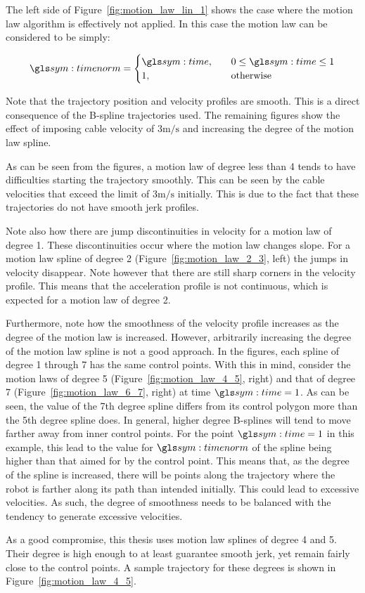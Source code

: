	The left side of Figure~\ref{fig:motion_law_lin_1} shows the case where the
	motion law algorithm is effectively not applied. In this case the motion law
	can be considered to be simply:

	\begin{equation}
		\timenorm =
			\begin{cases}
				\timesym, \quad &0 \leq \timesym \leq 1 \\
				1, \quad &\text{otherwise}
			\end{cases}
	\end{equation}

	Note that the trajectory position and velocity profiles are smooth. This is
	a direct consequence of the B-spline trajectories used. The remaining
	figures show the effect of imposing cable velocity of
	$3\si{\meter\per\second}$ and increasing the degree of the motion law
	spline.

	As can be seen from the figures, a motion law of degree less than 4
	tends to have difficulties starting the trajectory smoothly. This can be
	seen by the cable velocities that exceed the limit of
	$3\si{\meter\per\second}$ initially. This is due to the fact that these
	trajectories do not have smooth jerk profiles.

	Note also how there are jump discontinuities in velocity for a motion law of
	degree 1. These discontinuities occur where the motion law changes slope.
	For a motion law spline of degree 2 (Figure~\ref{fig:motion_law_2_3}, left)
	the jumps in velocity disappear. Note however that there are still sharp
	corners in the velocity profile. This means that the acceleration profile is
	not continuous, which is expected for a motion law of degree 2.

	Furthermore, note how the smoothness of the velocity profile increases as
	the degree of the motion law is increased. However, arbitrarily increasing
	the degree of the motion law spline is not a good approach. In the figures,
	each spline of degree 1 through 7 has the same control points. With this in
	mind, consider the motion laws of degree 5 (Figure~\ref{fig:motion_law_4_5},
	right) and that of degree 7 (Figure~\ref{fig:motion_law_6_7}, right) at time
	$\timesym = 1$. As can be seen, the value of the 7th degree spline differs
	from its control polygon more than the 5th degree spline does. In general,
	higher degree B-splines will tend to move farther away from inner control
	points. For the point $\timesym = 1$ in this example, this lead to the value
	for $\timenorm$ of the spline being higher than that aimed for by the
	control point. This means that, as the degree of the spline is increased,
	there will be points along the trajectory where the robot is farther along
	its path than intended initially. This could lead to excessive velocities.
	As such, the degree of smoothness needs to be balanced with the tendency to
	generate excessive velocities.

	As a good compromise, this thesis uses motion law splines of degree 4 and
	5. Their degree is high enough to at least guarantee smooth jerk, yet remain
	fairly close to the control points. A sample trajectory for these degrees is
	shown in Figure~\ref{fig:motion_law_4_5}.
